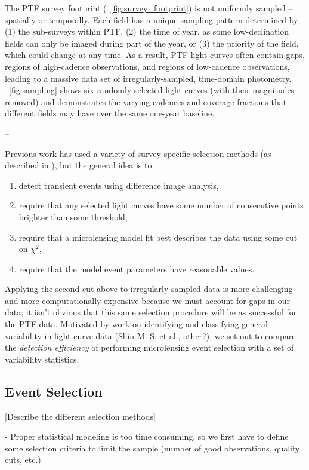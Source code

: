 \documentclass[12pt,preprint]{aastex}
\begin{document}
The PTF survey footprint (\figurename~\ref{fig:survey_footprint}) is not uniformly sampled -- spatially or temporally. Each field has a unique sampling pattern determined by (1) the sub-surveys within PTF, (2) the time of year, as some low-declination fields can only be imaged during part of the year, or (3) the priority of the field, which could  change at any time. As a result, PTF light curves often contain gaps, regions of high-cadence observations, and regions of low-cadence observations, leading to a massive data set of irregularly-sampled, time-domain photometry. \figurename~\ref{fig:sampling} shows six randomly-selected light curves (with their magnitudes removed) and demonstrates the varying cadences and coverage fractions that different fields may have over the same one-year baseline.

--

Previous work has used a variety of survey-specific selection methods (as described in \citealt{alcock2000, wyrzykowski2009, hamadache2009, sumi2011}), but the general idea is to \begin{enumerate}
	\item detect transient events using difference image analysis, 
	\item require that any selected light curves have some number of consecutive points brighter than some threshold,
	\item require that a microlensing model fit best describes the data using some cut on $\chi^2$,
	\item require that the model event parameters have reasonable values.
\end{enumerate}
Applying the second cut above to irregularly sampled data is more challenging and more computationally expensive because we must account for gaps in our data; it isn't obvious that this same selection procedure will be as successful for the PTF data. Motivated by work on identifying and classifying general variability in light curve data (Shin M.-S. et al., other?), we set out to compare the \textit{detection efficiency} of performing microlensing event selection with a set of variability statistics.

\subsection{Event Selection} \label{sec:event_selection}
[Describe the different selection methods]

- Proper statistical modeling is too time consuming, so we first have to define some selection criteria to limit the sample (number of good observations, quality cuts, etc.)
\end{document}
